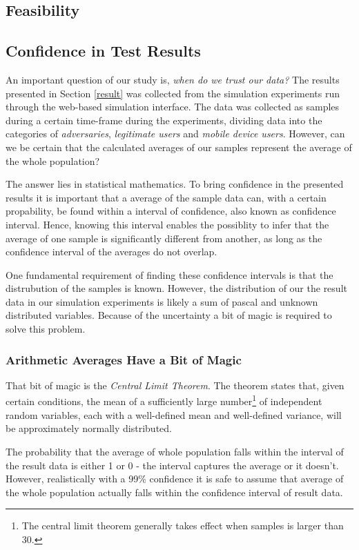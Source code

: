 \subsection{Feasibility}
\subsection{Confidence in Test Results}
An important question of our study is, \emph{when do we trust our data?} The results presented in Section \ref{result} was collected from the simulation experiments run through the web-based simulation interface. The data was collected as samples during a certain time-frame during the experiments, dividing data into the categories of \emph{adversaries}, \emph{legitimate users} and \emph{mobile device users}. However,  can we be certain that the calculated averages of our samples represent the average of the whole population?

The answer lies in statistical mathematics. To bring confidence in the presented results it is important that a average of the sample data can, with a certain propability, be found within a interval of confidence, also known as confidence interval. Hence, knowing this interval enables the possiblity to infer that the average of one sample is significantly different from another, as long as the confidence interval of the averages do not overlap.

One fundamental requirement of finding these confidence intervals is that the distrubution of the samples is known. However, the distribution of our the result data in our simulation experiments is likely a sum of pascal and unknown distributed variables. Because of the uncertainty a bit of magic is required to solve this problem. 

\subsubsection{Arithmetic Averages Have a Bit of Magic}
That bit of magic is the \emph{Central Limit Theorem}. The theorem states that, given certain conditions, the mean of a sufficiently large number\footnote{The central limit theorem generally takes effect when samples is larger than 30.} of independent random variables, each with a well-defined mean and well-defined variance, will be approximately normally distributed\cite{gunnar}.

The probability that the average of whole population falls within the interval of the result data is either 1 or 0 - the interval captures the average or it doesn't. However, realistically with a 99\% confidence it is safe to assume that average of the whole population actually falls within the confidence interval of result data.

